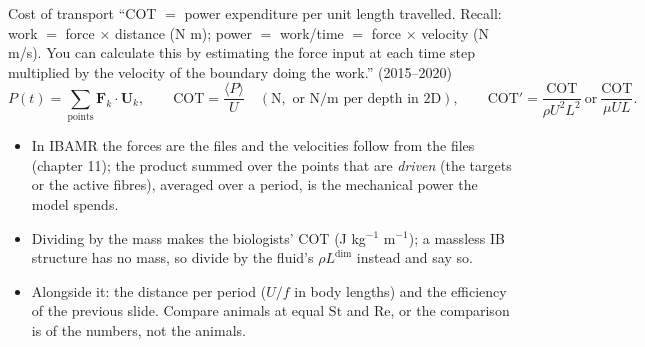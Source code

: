 \documentclass[aspectratio=169,11pt]{beamer}
\begin{document}
\begin{frame}{Cost of transport}
\label{fr:cot}
\small ``COT $=$ power expenditure per unit length travelled. Recall: work $=$ force $\times$ distance (N m); power $=$ work/time $=$ force $\times$ velocity (N m/s). You can calculate this by estimating the force input at each time step multiplied by the velocity of the boundary doing the work.'' (2015--2020)
\[
  P(t) = \sum_{\text{points}} \mathbf{F}_k\cdot\mathbf{U}_k, \qquad \mathrm{COT} = \frac{\langle P\rangle}{U} \quad (\mathrm{N}, \text{ or N/m per depth in 2D}), \qquad \mathrm{COT}' = \frac{\mathrm{COT}}{\rho U^2 L^2}\ \text{or}\ \frac{\mathrm{COT}}{\mu U L}.
\]
\begin{itemize}
  \item In IBAMR the forces are the  files and the velocities follow from the  files (chapter 11); the product summed over the points that are \emph{driven} (the targets or the active fibres), averaged over a period, is the mechanical power the model spends.
  \item Dividing by the mass makes the biologists' COT (J kg$^{-1}$ m$^{-1}$); a massless IB structure has no mass, so divide by the fluid's $\rho L^{\mathrm{dim}}$ instead and say so.
  \item Alongside it: the distance per period ($U/f$ in body lengths) and the efficiency of the previous slide. Compare animals at equal $\mathrm{St}$ and $\mathrm{Re}$, or the comparison is of the numbers, not the animals.
\end{itemize}
\end{frame}
\end{document}
